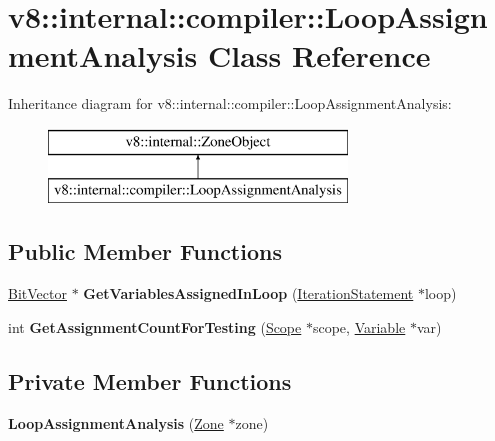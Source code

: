 \hypertarget{classv8_1_1internal_1_1compiler_1_1_loop_assignment_analysis}{}\section{v8\+:\+:internal\+:\+:compiler\+:\+:Loop\+Assignment\+Analysis Class Reference}
\label{classv8_1_1internal_1_1compiler_1_1_loop_assignment_analysis}
Inheritance diagram for v8\+:\+:internal\+:\+:compiler\+:\+:Loop\+Assignment\+Analysis\+:\begin{figure}[H]
\begin{center}
\leavevmode
\includegraphics[height=2.000000cm]{classv8_1_1internal_1_1compiler_1_1_loop_assignment_analysis}
\end{center}
\end{figure}
\subsection*{Public Member Functions}
\begin{DoxyCompactItemize}
\item 
\hyperlink{classv8_1_1internal_1_1_bit_vector}{Bit\+Vector} $\ast$ {\bfseries Get\+Variables\+Assigned\+In\+Loop} (\hyperlink{classv8_1_1internal_1_1_iteration_statement}{Iteration\+Statement} $\ast$loop)\hypertarget{classv8_1_1internal_1_1compiler_1_1_loop_assignment_analysis_a6056b7587ba09cbe4273174f6290451e}{}\label{classv8_1_1internal_1_1compiler_1_1_loop_assignment_analysis_a6056b7587ba09cbe4273174f6290451e}

\item 
int {\bfseries Get\+Assignment\+Count\+For\+Testing} (\hyperlink{classv8_1_1internal_1_1_scope}{Scope} $\ast$scope, \hyperlink{classv8_1_1internal_1_1_variable}{Variable} $\ast$var)\hypertarget{classv8_1_1internal_1_1compiler_1_1_loop_assignment_analysis_a577030b965c4caa5d59fb4fd8a5d1f87}{}\label{classv8_1_1internal_1_1compiler_1_1_loop_assignment_analysis_a577030b965c4caa5d59fb4fd8a5d1f87}

\end{DoxyCompactItemize}
\subsection*{Private Member Functions}
\begin{DoxyCompactItemize}
\item 
{\bfseries Loop\+Assignment\+Analysis} (\hyperlink{classv8_1_1internal_1_1_zone}{Zone} $\ast$zone)\hypertarget{classv8_1_1internal_1_1compiler_1_1_loop_assignment_analysis_a7d9a43710f9ec0cf4a93dee7f6381d75}{}\label{classv8_1_1internal_1_1compiler_1_1_loop_assignment_analysis_a7d9a43710f9ec0cf4a93dee7f6381d75}

\end{DoxyCompactItemize}
